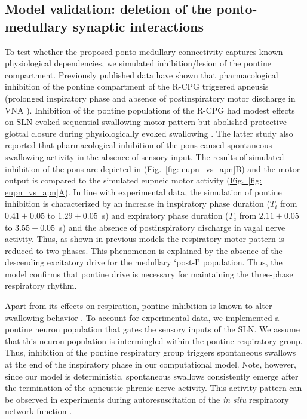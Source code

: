 \documentclass[pdflatex,sn-mathphys-ay]{sn-jnl}%
\renewcommand{\figureautorefname}{Fig.}
\newcommand{\Figref}[2][]{\hyperref[#2]{\figureautorefname~\ref*{#2}#1}}
\theoremstyle{thmstyleone}%
\theoremstyle{thmstyletwo}%
\theoremstyle{thmstylethree}%
\begin{document}
\subsection{Model validation: deletion of the ponto-medullary synaptic interactions}
To test whether the proposed ponto-medullary connectivity captures known physiological dependencies, we simulated inhibition/lesion of the pontine compartment.
Previously published data have shown that pharmacological inhibition of the pontine compartment of the R-CPG triggered apneusis (prolonged inspiratory phase and absence of postinspiratory motor discharge in VNA \citep{dutschmann2006kolliker}). Inhibition of the pontine populations of the R-CPG had modest effects on SLN-evoked sequential swallowing motor pattern \citep{takemura2022effect} but abolished protective glottal closure during physiologically evoked swallowing \citep{bautista2014ponto}. The latter study also reported that pharmacological inhibition of the pons caused spontaneous swallowing activity in the absence of sensory input. The results of simulated inhibition of the pons are depicted in (\Figref[B]{fig: eupn_vs_apn}) and the motor output is compared to the simulated eupneic motor activity (\Figref[A]{fig: eupn_vs_apn}). In line with experimental data, the simulation of pontine inhibition is characterized by an increase in inspiratory phase duration ($T_i$ from $0.41 \pm 0.05$ to $1.29 \pm 0.05$~s) and expiratory phase duration ($T_e$ from $2.11 \pm 0.05$ to $3.55 \pm 0.05$~s) and the absence of postinspiratory discharge in vagal nerve activity. Thus, as shown in previous models \citep{smith2007spatial} the respiratory motor pattern is reduced to two phases. This phenomenon is explained by the absence of the descending excitatory drive for the medullary `post-I' population. Thus, the model confirms that pontine drive is necessary for maintaining the three-phase respiratory rhythm.

Apart from its effects on respiration, pontine inhibition is known to alter swallowing behavior \citep{takemura2022effect}. To account for experimental data, we implemented a pontine neuron population that gates the sensory inputs of the SLN. We assume that this neuron population is intermingled within the pontine respiratory group. Thus, inhibition of the pontine respiratory group triggers spontaneous swallows at the end of the inspiratory phase in our computational model. Note, however, since our model is deterministic, spontaneous swallows consistently emerge after the termination of the apneustic phrenic nerve activity. This activity pattern can be observed in experiments during autoresuscitation of the \textit{in situ} respiratory network function \citep{bautista2014spontaneous}.
\end{document}
